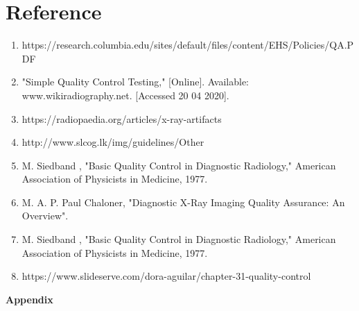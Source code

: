 \documentclass[12pt]{article}
\begin{document}
\section{Reference}
\begin{enumerate}
    \item https://research.columbia.edu/sites/default/files/content/EHS/Policies/QA.PDF
    \item "Simple Quality Control Testing," [Online]. Available: www.wikiradiography.net. [Accessed 20 04 2020].
    \item https://radiopaedia.org/articles/x-ray-artifacts
    \item http://www.slcog.lk/img/guidelines/Other%
    \item M. Siedband , "Basic Quality Control in Diagnostic Radiology," American Association of Physicists in Medicine, 1977.
    \item M. A. P. Paul Chaloner, "Diagnostic X-Ray Imaging Quality Assurance: An Overview".
    \item M. Siedband , "Basic Quality Control in Diagnostic Radiology," American Association of Physicists in Medicine, 1977.
    \item https://www.slideserve.com/dora-aguilar/chapter-31-quality-control
\end{enumerate}
\pagebreak
\textbf{\Large{Appendix}}
\begin{appendix}
  \listoffigures
\end{appendix}
\end{document}

